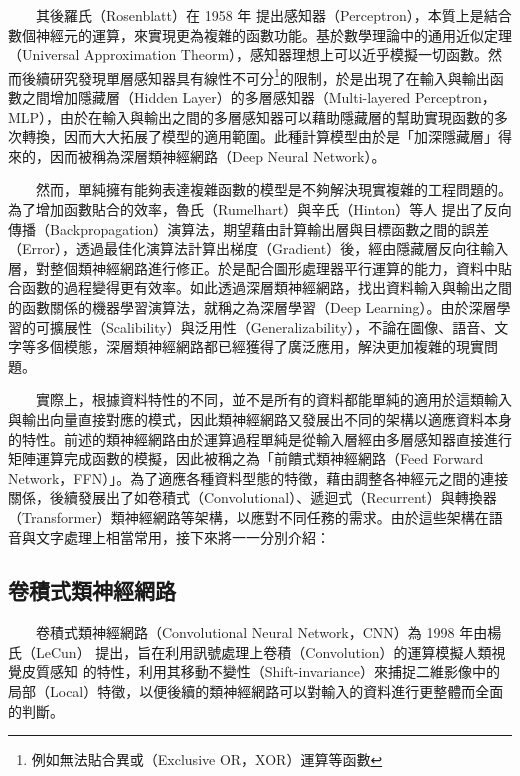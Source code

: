 　　其後羅氏（Rosenblatt）在 1958 年 \cite{rosenblatt_perceptron_1958} 提出感知器（Perceptron），本質上是結合數個神經元的運算，來實現更為複雜的函數功能。基於數學理論中的通用近似定理（Universal Approximation Theorm）\cite{funahashi_approximate_1989}，感知器理想上可以近乎模擬一切函數。然而後續研究發現單層感知器具有線性不可分\footnote{例如無法貼合異或（Exclusive OR，XOR）運算等函數}的限制，於是出現了在輸入與輸出函數之間增加隱藏層（Hidden Layer）的多層感知器（Multi-layered Perceptron，MLP），由於在輸入與輸出之間的多層感知器可以藉助隱藏層的幫助實現函數的多次轉換，因而大大拓展了模型的適用範圍。此種計算模型由於是「加深隱藏層」得來的，因而被稱為深層類神經網路（Deep Neural Network）。
  
　　然而，單純擁有能夠表達複雜函數的模型是不夠解決現實複雜的工程問題的。為了增加函數貼合的效率，魯氏（Rumelhart）與辛氏（Hinton）等人 \cite{rumelhart_learning_1986, rumelhart_learning_1987} 提出了反向傳播（Backpropagation）演算法，期望藉由計算輸出層與目標函數之間的誤差（Error），透過最佳化演算法計算出梯度（Gradient）後，經由隱藏層反向往輸入層，對整個類神經網路進行修正。於是配合圖形處理器平行運算的能力，資料中貼合函數的過程變得更有效率。如此透過深層類神經網路，找出資料輸入與輸出之間的函數關係的機器學習演算法，就稱之為深層學習（Deep Learning）。由於深層學習的可擴展性（Scalibility）與泛用性（Generalizability），不論在圖像、語音、文字等多個模態，深層類神經網路都已經獲得了廣泛應用，解決更加複雜的現實問題。

　　實際上，根據資料特性的不同，並不是所有的資料都能單純的適用於這類輸入與輸出向量直接對應的模式，因此類神經網路又發展出不同的架構以適應資料本身的特性。前述的類神經網路由於運算過程單純是從輸入層經由多層感知器直接進行矩陣運算完成函數的模擬，因此被稱之為「前饋式類神經網路（Feed Forward Network，FFN）」。為了適應各種資料型態的特徵，藉由調整各神經元之間的連接關係，後續發展出了如卷積式（Convolutional）、遞迴式（Recurrent）與轉換器（Transformer）類神經網路等架構，以應對不同任務的需求。由於這些架構在語音與文字處理上相當常用，接下來將一一分別介紹：

\subsection{卷積式類神經網路}

　　卷積式類神經網路（Convolutional Neural Network，CNN）為 1998 年由楊氏（LeCun） \cite{lecun_gradient-based_1998} 提出，旨在利用訊號處理上卷積（Convolution）的運算模擬人類視覺皮質感知 \cite{hubel_receptive_1959} 的特性，利用其移動不變性（Shift-invariance）來捕捉二維影像中的局部（Local）特徵，以便後續的類神經網路可以對輸入的資料進行更整體而全面的判斷。

